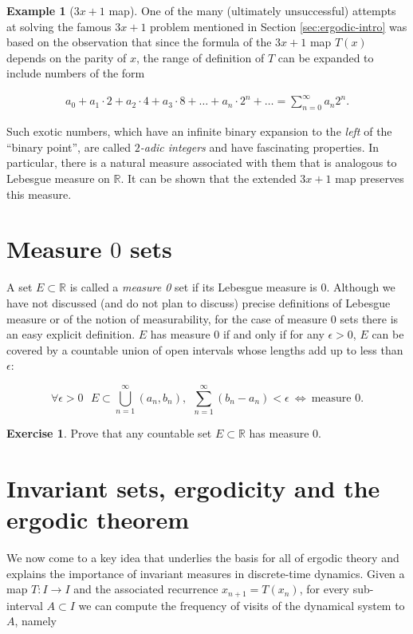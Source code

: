 \documentclass[11pt]{report}
\theoremstyle{plain}
\theoremstyle{definition}
\newtheorem{example}[thm]{Example}
\newtheorem{xexercise}[thm]{Exercise}
\begin{document}
\begin{example}[$3x+1$ map]
One of the many (ultimately unsuccessful) attempts at
solving the famous $3x+1$ problem mentioned in Section
\ref{sec:ergodic-intro} was based on the observation that
since the formula of the $3x+1$ map $T(x)$ depends on
the parity of $x$, the range of definition of $T$ can
be expanded to include numbers of the form

\begin{align*}
a_0 + a_1 \cdot 2 + a_2 \cdot 4 + a_3\cdot 8 + \ldots + a_n \cdot 2^n + \ldots = \sum_{n=0}^\infty a_n 2^n.
\end{align*}

\noindent Such exotic numbers, which have an infinite binary
expansion to the \emph{left} of the ``binary point'', are
called \emph{$2$-adic integers} and have fascinating
properties. In particular, there is a natural measure
associated with them that is analogous to Lebesgue
measure on $\mathbb{R}$. It can be shown that the
extended $3x+1$ map preserves this measure.
\end{example}

\section{Measure $0$ sets}

A set $E\subset \mathbb{R}$ is called a \emph{measure 0}
set if its Lebesgue measure is 0. Although we have not
discussed (and do not plan to discuss) precise
definitions of Lebesgue measure or of the notion of
measurability, for the case of measure 0 sets there is
an easy explicit definition. $E$ has measure 0 if and
only if for any $\epsilon>0$, $E$ can be covered by a
countable union of open intervals whose lengths add up
to less than $\epsilon$:

\[
\forall \epsilon>0\ \ \ E\subset\bigcup_{n=1}^\infty (a_n, b_n), \ \  \sum_{n=1}^\infty (b_n-a_n) < \epsilon \ \iff \ \textrm{measure 0.}
\]

\begin{xexercise}
Prove that any countable set $E\subset \mathbb{R}$ has
measure 0.
\end{xexercise}

\section{Invariant sets, ergodicity and the ergodic theorem}

We now come to a key idea that underlies the basis for
all of ergodic theory and explains the importance of
invariant measures in discrete-time dynamics. Given a
map $T:I\to I$ and the associated recurrence
$x_{n+1}=T(x_n)$, for every sub-interval $A\subset I$
we can compute the frequency of visits of the
dynamical system to $A$, namely
\end{document}
